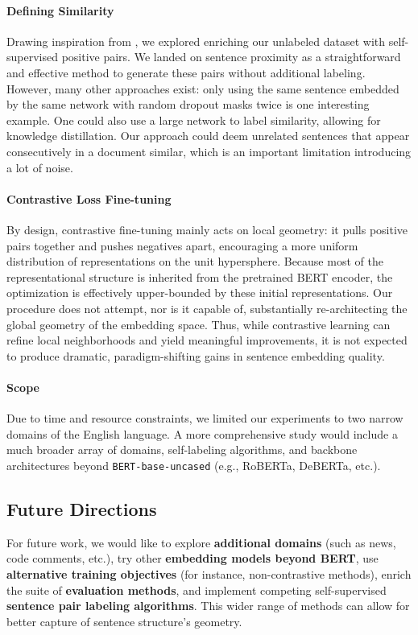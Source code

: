 \documentclass{article}
\begin{document}
\paragraph*{Defining Similarity} Drawing inspiration from \cite{gao2021simcse}, we
explored enriching our unlabeled dataset with self-supervised positive pairs. We landed on sentence proximity
as a straightforward and effective method to generate these pairs without additional labeling. However, many
other approaches exist: only using the same sentence embedded by the same network with random dropout masks
twice is one interesting example. One could also use a large network to label similarity, allowing for
knowledge distillation. Our approach could deem unrelated sentences that appear consecutively in a document
similar, which is an important limitation introducing a lot of noise.

\paragraph*{Contrastive Loss Fine-tuning} By design, contrastive fine-tuning mainly acts on local geometry:
it pulls positive pairs together and pushes negatives apart, encouraging a more uniform distribution of
representations on the unit hypersphere. Because most of the representational structure is inherited from the
pretrained BERT encoder, the optimization is effectively upper-bounded by these initial representations. Our
procedure does not attempt, nor is it capable of, substantially re-architecting the global geometry of the
embedding space. Thus, while contrastive learning can refine local neighborhoods and yield meaningful
improvements, it is not expected to produce dramatic, paradigm-shifting gains in sentence embedding quality.

\paragraph*{Scope} Due to time and resource constraints, we limited our experiments to two narrow domains of
the English language. A more comprehensive study would include a much broader array of domains, self-labeling
algorithms, and backbone architectures beyond \texttt{BERT-base-uncased} (e.g., RoBERTa, DeBERTa, etc.).

\subsection{Future Directions}
For future work, we would like to explore \textbf{additional domains} (such as news, code
comments, etc.), try other \textbf{embedding models beyond BERT}, use
\textbf{alternative training objectives} (for instance, non-contrastive methods), enrich the suite of
\textbf{evaluation methods}, and implement competing self-supervised \textbf{sentence pair labeling
algorithms}. This wider range of methods can allow for better capture of sentence structure's geometry.
\end{document}
